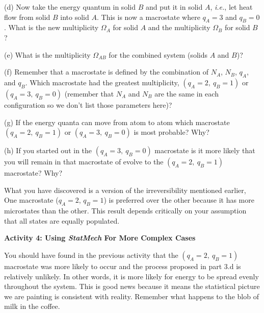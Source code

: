 (d) Now take the energy quantum in solid $B$ and put it in solid $A$,
{\it i.e.}, let heat flow from solid $B$ into solid $A$.
This is now a macrostate where $q_A=3$ and $q_B=0$.
What is the new multiplicity $\Omega_A$ for solid $A$ and the  multiplicity $\Omega_B$ for solid $B$?
\vspace{20mm}

(e) What is the multiplicity $\Omega_{AB}$ for the combined system (solids $A$ and $B$)?
\vspace{15mm}

(f) Remember that a macrostate is defined by the combination of $N_A$, $N_B$, $q_A$, and $q_B$.
Which macrostate had the greatest multiplicity, $(q_A=2, ~ q_B=1)$ or $(q_A=3, ~ q_B=0)$
(remember that $N_A$ and $N_B$ are the same in each configuration so we don't list those parameters here)?
\vspace{15mm}

(g) If the energy quanta can move from atom to atom
which macrostate $(q_A=2, ~ q_B=1)$ or $(q_A=3, ~ q_B=0)$ is most probable? Why?
\vspace{15mm}

(h) If you started out in the $(q_A=3, ~ q_B=0)$ macrostate is it more likely that you will remain
in that macrostate of evolve to the $(q_A=2, ~ q_B=1)$ macrostate? Why?
\vspace{15mm}

What you have discovered is a version of the irreversibility mentioned earlier,
One macrostate ($q_A=2$, $q_B=1$) is preferred over the other because it has more microstates
than the other.
This result depends critically on your assumption that all states are equally populated.

\textbf{Activity 4: Using {\it StatMech} For More Complex Cases}

You should have found in the previous activity that the $(q_A=2, ~ q_B=1)$ 
macrostate was more likely
to occur and the process proposed in part 3.d is relatively unlikely.
In other words, it is more likely for energy to be spread evenly throughout the system.
This is good news because it means the statistical picture we are painting is consistent
with reality.
Remember what happens to the blob of milk in the coffee.

